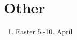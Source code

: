 \documentclass[landscape,a4paper]{article}
\begin{document}
\newpage
\section{Other}%
\label{sec:other}

\begin{enumerate}[label=\arabic*)]
    \item Easter 5.-10. April
\end{enumerate}


 \printbibliography
\end{document}
